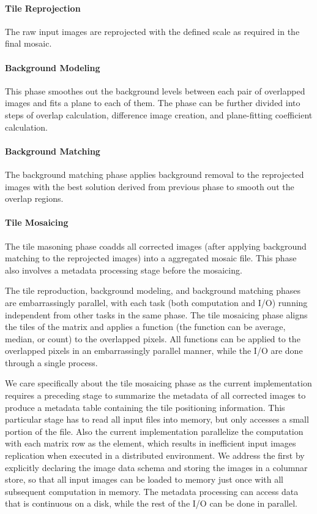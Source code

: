 \documentclass{acm_proc_article-sp}
\begin{document}
\paragraph{Tile Reprojection}
The raw input images are reprojected with the defined scale as required in the final mosaic. 

\paragraph{Background Modeling}
This phase smoothes out the background levels between each pair of overlapped images and fits a plane
to each of them. The phase can be further divided into steps of overlap calculation, difference image
creation, and plane-fitting coefficient calculation.

\paragraph{Background Matching}
The background matching phase applies background removal to the reprojected images with the best
solution derived from previous phase to smooth out the overlap regions.

\paragraph{Tile Mosaicing}
The tile masoning phase coadds all corrected images (after applying background matching to the
reprojected images) into a aggregated mosaic file. This phase also involves a metadata processing stage
before the mosaicing.

The tile reproduction, background modeling, and background matching phases are embarrassingly
parallel, with each task (both computation and I/O) running independent from other tasks in the same
phase. The tile mosaicing phase aligns the tiles of the matrix and applies a function (the function can be
average, median, or count) to the overlapped pixels. All functions can be applied to the overlapped pixels
in an embarrassingly parallel manner, while the I/O are done through a single process.

We care specifically about the tile mosaicing phase as the current implementation requires a preceding
stage to summarize the metadata of all corrected images to produce a metadata table containing the tile
positioning information. This particular stage has to read all input files into memory, but only accesses a
small portion of the file. Also the current implementation parallelize the computation with each matrix row
as the element, which results in inefficient input images replication when executed in a distributed
environment. We address the first by explicitly declaring the image data schema and storing the images
in a columnar store, so that all input images can be loaded to memory just once with all subsequent
computation in memory. The metadata processing can access data that is continuous on a disk, while the
rest of the I/O can be done in parallel.
\end{document}

